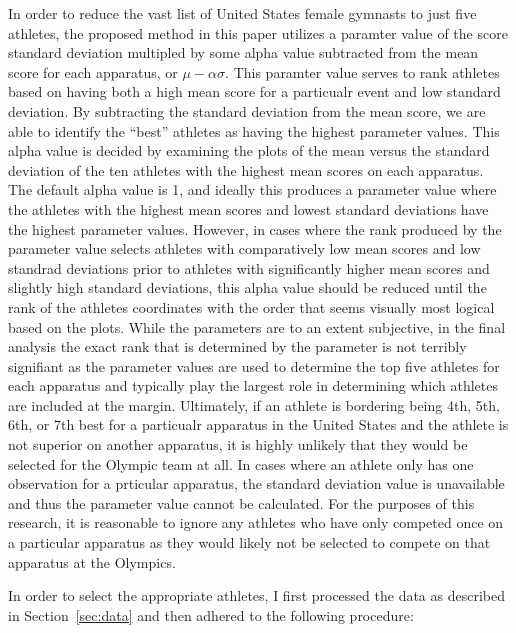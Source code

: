 \documentclass[12pt]{article}
\begin{document}
In order to reduce the vast list of United States female gymnasts to just five athletes, the proposed method in 
this paper utilizes a paramter value of the score standard deviation multipled by some alpha value subtracted 
from the mean score for each apparatus, or $\mu - \alpha \sigma$. This paramter value serves to rank athletes based 
on having both a high mean score for a particualr event and low standard deviation. By subtracting the standard deviation 
from the mean score, we are able to identify the ``best'' athletes as having the highest parameter values. 
This alpha value is decided by examining the plots of the mean versus the standard deviation of the ten athletes 
with the highest mean scores on each apparatus. The default alpha value is 1, and ideally this produces a parameter 
value where the athletes with the highest mean scores and lowest standard deviations have the highest parameter values. 
However, in cases where the rank produced by the parameter value selects athletes with comparatively low mean scores and 
low standrad deviations prior to athletes with significantly higher mean scores and slightly high standard deviations, 
this alpha value should be reduced until the rank of the athletes coordinates with the order that seems visually most 
logical based on the plots. While the parameters are to an extent subjective, in the final analysis the exact rank that 
is determined by the parameter is not terribly signifiant as the parameter values are used to determine the top five 
athletes for each apparatus and typically play the largest role in determining which athletes are included at the margin. 
Ultimately, if an athlete is bordering being 4th, 5th, 6th, or 7th best for a particualr apparatus in the United States 
and the athlete is not superior on another apparatus, it is highly unlikely that they would be selected for the Olympic 
team at all. In cases where an athlete only has one observation for a prticular apparatus, the 
standard deviation value is unavailable and thus the parameter value cannot be calculated. For the purposes of this 
research, it is reasonable to ignore any athletes who have only competed once on a particular apparatus as they would 
likely not be selected to compete on that apparatus at the Olympics.

In order to select the appropriate athletes, I first processed the data as described in Section~\ref{sec:data} 
and then adhered to the following procedure:
\end{document}
